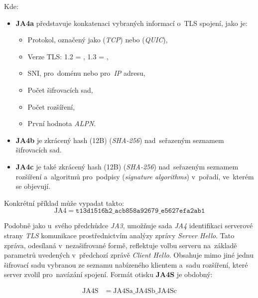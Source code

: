 Kde:
\begin{itemize}
	\item \textbf{JA4a} představuje konkatenaci vybraných informací o~TLS spojení, jako je:
	      \begin{itemize}
	      	\item Protokol, označený jako \texttt{} (\textit{TCP}) nebo \texttt{} (\textit{QUIC}),
	      	\item Verze TLS: 1.2 = \texttt{}, 1.3 = \texttt{},
	      	\item SNI, \texttt{} pro~doménu nebo \texttt{} pro~\textit{IP} adresu,
	      	\item Počet šifrovacích sad,
	      	\item Počet rozšíření,
	      	\item První hodnota \textit{ALPN}.
	      \end{itemize}
	      	      
	\item \textbf{JA4b} je zkrácený hash (12B) (\textit{SHA-256}) nad~seřazeným seznamem šifrovacích sad.
	      	      
	\item \textbf{JA4c} je také zkrácený hash (12B) (\textit{SHA-256}) nad~seřazeným seznamem rozšíření a~algoritmů pro~podpisy (\textit{signature algorithms}) v~pořadí, ve~kterém se objevují.
	      	      
\end{itemize}
Konkrétní příklad může vypadat takto:
\[
	\text{JA4} = \texttt{t13d1516h2} \_ \texttt{acb858a92679} \_ \texttt{e5627efa2ab1}
\]
	      
	      
Podobně jako u~svého předchůdce \textit{JA3}, umožňuje sada \textit{JA4} identifikaci serverové strany \textit{TLS} komunikace prostřednictvím analýzy zprávy \textit{Server Hello}. Tato zpráva, odesílaná v~nezašifrované formě, reflektuje volbu serveru na~základě parametrů uvedených v~předchozí zprávě \textit{Client Hello}. Obsahuje mimo jiné jednu šifrovací sadu vybranou ze seznamu nabízeného klientem a~sadu rozšíření, které server zvolil pro~navázání spojení. Formát otisku \textbf{JA4S} je obdobný:

\[
	\begin{aligned}
		\text{JA4S} & = \text{JA4Sa} \_ \text{JA4Sb} \_ \text{JA4Sc} 
	\end{aligned}
\]


